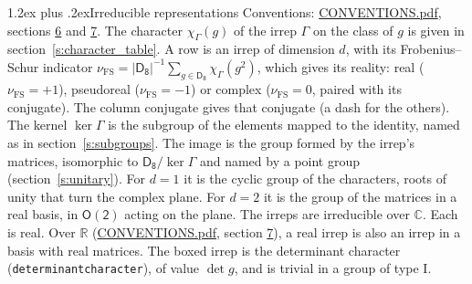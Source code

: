 \documentclass[10pt,a4paper]{article}
\makeatletter
\renewcommand\section{\@startsection{section}{1}{\z@}{-3ex plus -1ex minus -.2ex}%
  {1.2ex plus .2ex}{\normalfont\large\sffamily\bfseries\color{parttitle}}}
\numberwithin{equation}{section}
\newcommand{\grp}[1]{\mathsf{#1}}
\newcommand{\irchar}[1]{\chi_{#1}}
\newcommand{\fsind}{\nu_{\mathrm{FS}}}
\makeatother
\begin{document}
\section{Irreducible representations}\label{s:irreps}
Conventions: \href{../../CONVENTIONS.pdf}{CONVENTIONS.pdf}, sections \href{../../CONVENTIONS.pdf\#conv.6}{6} and \href{../../CONVENTIONS.pdf\#conv.7}{7}.
\leavevmode\label{n:function.character}\label{n:irrep.Gamma}The character $\irchar{\Gamma}(g)$ of the irrep $\Gamma$ on the class of $g$ is given in section~\ref{s:character_table}.
\leavevmode\label{n:index.dimension}\label{n:index.frobenius}\label{n:head.irrep}\label{n:head.reality}A row is an irrep of dimension $d$, with its Frobenius--Schur indicator $\fsind = |\grp{D_{8}}|^{-1}\allowbreak\sum_{g\in\grp{D_{8}}}\irchar{\Gamma}(g^2)$, which gives its reality: real ($\fsind = +1$), pseudoreal ($\fsind = -1$) or complex ($\fsind = 0$, paired with its conjugate). \label{n:head.conjugate}The column conjugate gives that conjugate (a dash for the others). \label{n:head.kernel}The kernel $\ker\Gamma$ is the subgroup of the elements mapped to the identity, named as in section~\ref{s:subgroups}. \label{n:head.image}The image is the group formed by the irrep's matrices, isomorphic to $\grp{D_{8}}/\ker\Gamma$ and named by a point group (section~\ref{s:unitary}). For $d = 1$ it is the cyclic group of the characters, roots of unity that turn the complex plane. For $d = 2$ it is the group of the matrices in a real basis, in $\grp{O(2)}$ acting on the plane. The irreps are irreducible over $\mathbb{C}$. Each is real. Over $\mathbb{R}$ (\href{../../CONVENTIONS.pdf}{CONVENTIONS.pdf}, section \href{../../CONVENTIONS.pdf\#conv.7}{7}), a real irrep is also an irrep in a basis with real matrices. \label{n:mark.determinant}The boxed irrep is the determinant character (\texttt{determinantcharacter}), of value $\det g$, and is trivial in a group of type I.
\setlength{\emergencystretch}{2em}\par\setlength{\emergencystretch}{0pt}
\end{document}
